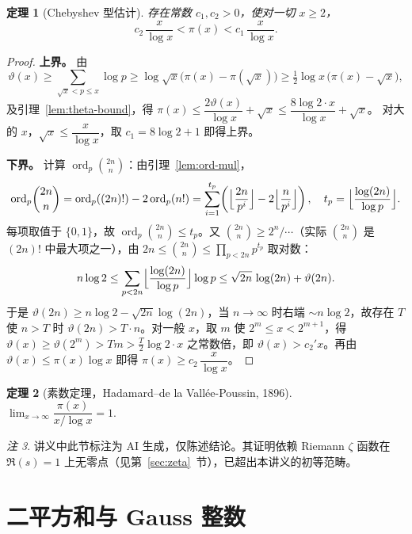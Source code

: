\documentclass{article}
\newcommand{\ord}{\operatorname{ord}}
\theoremstyle{plain}
\newtheorem{thm}{定理}[section]
\theoremstyle{definition}
\theoremstyle{remark}
\newtheorem{rem}[thm]{注}
\begin{document}
\begin{thm}[Chebyshev 型估计]\label{thm:cheby}
  存在常数 $c_1,c_2>0$，使对一切 $x\ge 2$，
  \[
    c_2\,\frac{x}{\log x}<\pi(x)<c_1\,\frac{x}{\log x}.
  \]
\end{thm}

\begin{proof}
  \textbf{上界。} 由
  \[
    \vartheta(x)\ge\sum_{\sqrt{x}<p\le x}\log p\ge\log\sqrt{x}\bigl(\pi(x)-\pi(\sqrt{x})\bigr)
    \ge\tfrac12\log x\,\bigl(\pi(x)-\sqrt{x}\bigr),
  \]
  及引理~\ref{lem:theta-bound}，得 $\pi(x)\le \dfrac{2\vartheta(x)}{\log x}+\sqrt{x}\le\dfrac{8\log2\cdot x}{\log x}+\sqrt{x}$。
  对大的 $x$，$\sqrt{x}\le\dfrac{x}{\log x}$，取 $c_1=8\log2+1$ 即得上界。

  \textbf{下界。} 计算 $\ord_p\!\binom{2n}{n}$：由引理~\ref{lem:ord-mul}，
  \[
    \ord_p\!\binom{2n}{n}=\ord_p((2n)!)-2\ord_p(n!)=\sum_{i=1}^{t_p}\!\left(\Bigl\lfloor\frac{2n}{p^i}\Bigr\rfloor-2\Bigl\lfloor\frac{n}{p^i}\Bigr\rfloor\right),\quad
    t_p=\Bigl\lfloor\frac{\log(2n)}{\log p}\Bigr\rfloor.
  \]
  每项取值于 $\{0,1\}$，故 $\ord_p\!\binom{2n}{n}\le t_p$。又 $\binom{2n}{n}\ge 2^n/\cdots$（实际 $\binom{2n}{n}$ 是 $(2n)!$ 中最大项之一），由 $2n\le\binom{2n}{n}\le\prod_{p<2n}p^{t_p}$ 取对数：
  \[
    n\log2\le\sum_{p<2n}\Bigl\lfloor\frac{\log(2n)}{\log p}\Bigr\rfloor\log p
    \le\sqrt{2n}\,\log(2n)+\vartheta(2n).
  \]
  于是 $\vartheta(2n)\ge n\log2-\sqrt{2n}\log(2n)$，当 $n\to\infty$ 时右端 $\sim n\log2$，故存在 $T$ 使 $n>T$ 时 $\vartheta(2n)>T\cdot n$。对一般 $x$，取 $m$ 使 $2^m\le x<2^{m+1}$，得 $\vartheta(x)\ge\vartheta(2^m)>Tm>\tfrac{T}{2}\log2\cdot x$ 之常数倍，即 $\vartheta(x)>c_2'x$。再由 $\vartheta(x)\le\pi(x)\log x$ 即得 $\pi(x)\ge c_2\,\dfrac{x}{\log x}$。
\end{proof}

\begin{thm}[素数定理，Hadamard--de la Vall\'ee-Poussin, 1896]\label{thm:PNT}
  $\displaystyle\lim_{x\to\infty}\dfrac{\pi(x)}{x/\log x}=1.$
\end{thm}

\begin{rem}
  讲义中此节标注为 AI 生成，仅陈述结论。其证明依赖 Riemann $\zeta$ 函数在 $\Re(s)=1$ 上无零点（见第~\ref{sec:zeta}~节），已超出本讲义的初等范畴。
\end{rem}

\section{二平方和与 Gauss 整数}
\end{document}
